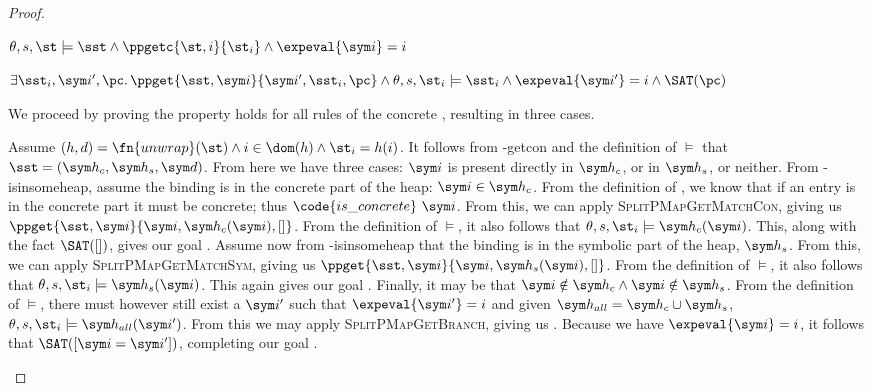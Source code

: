 \begin{proof}


\pfassume \begin{hypvlist}
 $\theta,s,\st \models \sst \land \ppgetc{\st, i}{\st_i} \land \expeval{\sym i}=i$
\end{hypvlist}
\pfprove \begin{goalvlist}
 $\exists \sst_i, \sym i', \pc \ldotp \ppget{\sst,\sym i}{\sym i', \sst_i, \pc} \land \theta,s,\st_i\models\sst_i \land \expeval{\sym i'}=i \land \SAT(\pc)$
\end{goalvlist}

We proceed by proving the property holds for all rules of the concrete , resulting in three cases.


\begin{hypvlist}
 Assume $(h,d)=\fn{unwrap}(\st) \land i\in\dom(h) \land \st_{i}=h(i)$.
 It follows from \hyp{getcon} and the definition of $\models$ that $\sst=(\sym h_c, \sym h_s, \sym d)$. From here we have three cases: $\sym i$ is present directly in $\sym h_c$, or in $\sym h_s$, or neither.
 From \hyp{isinsomeheap}, assume the binding is in the concrete part of the heap: $\sym i \in \sym h_c$. From the definition of , we know that if an entry is in the concrete part it must be concrete; thus $\code{is\_concrete}~\sym i$. From this, we can apply \textsc{SplitPMapGetMatchCon}, giving us $\ppget{\sst,\sym i}{\sym i, \sym h_c(\sym i), []}$. From the definition of $\models$, it also follows that $\theta,s,\st_i\models \sym h_c(\sym i)$. This, along with the fact $\SAT([])$, gives our goal .
 Assume now from \hyp{isinsomeheap} that the binding is in the symbolic part of the heap, $\sym h_s$. From this, we can apply \textsc{SplitPMapGetMatchSym}, giving us $\ppget{\sst,\sym i}{\sym i, \sym h_s(\sym i), []}$. From the definition of $\models$, it also follows that $\theta,s,\st_i\models \sym h_s(\sym i)$. This again gives our goal .
 Finally, it may be that $\sym i \notin \sym h_c \land \sym i \notin \sym h_s$. From the definition of $\models$, there must however still exist a $\sym i'$ such that $\expeval{\sym i'}=i$ and given $\sym h_{all}=\sym h_c\cup\sym h_s$, $\theta,s,\st_i\models \sym h_{all}(\sym i')$. From this we may apply \textsc{SplitPMapGetBranch}, giving us . Because we have $\expeval{\sym i}=i$, it follows that $\SAT([\sym i=\sym i'])$, completing our goal .
\end{hypvlist}


\end{proof}
